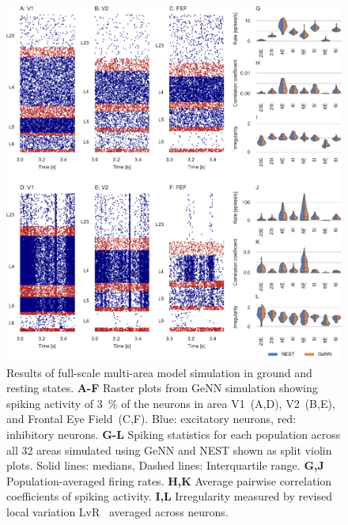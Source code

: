 \documentclass[9pt,a4paper]{amsart}
\newenvironment{fullwidth}{%
  \begin{adjustwidth}{-0.85in}{-0.85in}
}{\end{adjustwidth}}
\begin{document}
\begin{figure}
    \begin{fullwidth}
        \centering
        \includegraphics{figures/multi_area}
        \captionsetup{width=6.69in}
        \caption{Results of full-scale multi-area model simulation in ground and resting states. 
        \textbf{A-F} Raster plots from GeNN simulation showing spiking activity of \SI{3}{\percent} of the neurons in area V1~(A,D), V2~(B,E), and Frontal Eye Field~(C,F).
        Blue: excitatory neurons, red: inhibitory neurons.
        \textbf{G-L} Spiking statistics for each population across all 32 areas simulated using GeNN and NEST shown as split violin plots.
        Solid lines: medians, Dashed lines: Interquartile range.
        \textbf{G,J} Population-averaged firing rates.
        \textbf{H,K} Average pairwise correlation coefficients of spiking activity. 
        \textbf{I,L} Irregularity measured by revised local variation LvR~\citep{Shinomoto2009} averaged across neurons.}
        \label{fig:multi_area}
    \end{fullwidth}
\end{figure}
%
\end{document}
